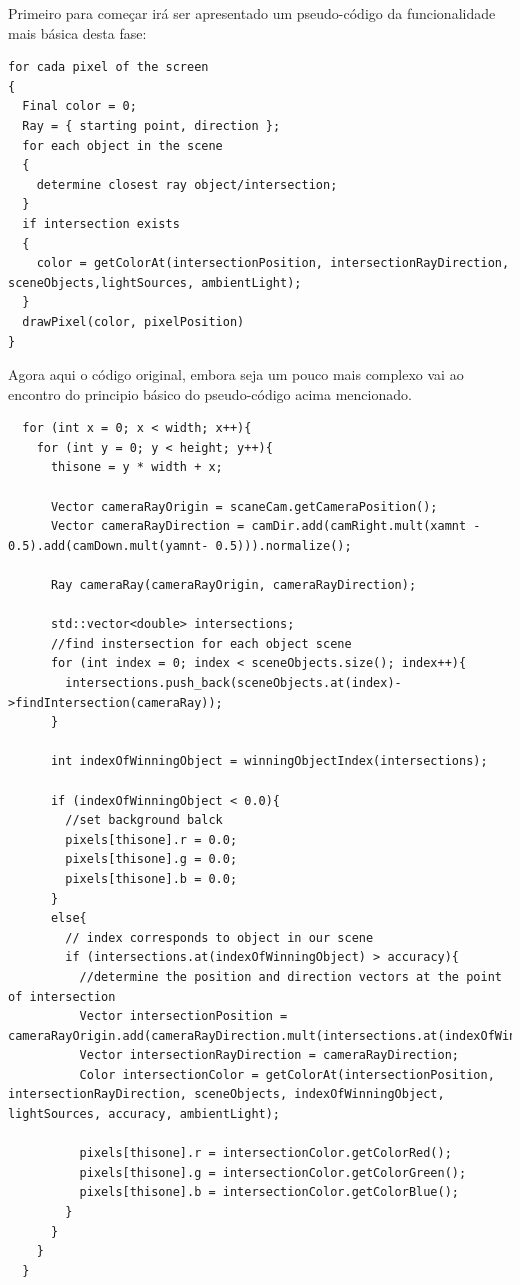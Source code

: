 \documentclass[12pt]{article}
\begin{document}
Primeiro para começar irá ser apresentado um pseudo-código da funcionalidade mais básica desta fase:\newline

\begin{lstlisting}
for cada pixel of the screen
{
  Final color = 0;
  Ray = { starting point, direction };
  for each object in the scene
  {
    determine closest ray object/intersection;
  }
  if intersection exists
  {
    color = getColorAt(intersectionPosition, intersectionRayDirection, sceneObjects,lightSources, ambientLight);
  }
  drawPixel(color, pixelPosition)
}
\end{lstlisting}

Agora aqui o código original, embora seja um pouco mais complexo vai ao encontro do principio básico do pseudo-código acima mencionado.\newline
\begin{lstlisting}
  for (int x = 0; x < width; x++){
    for (int y = 0; y < height; y++){
      thisone = y * width + x;

      Vector cameraRayOrigin = scaneCam.getCameraPosition();
      Vector cameraRayDirection = camDir.add(camRight.mult(xamnt - 0.5).add(camDown.mult(yamnt- 0.5))).normalize();

      Ray cameraRay(cameraRayOrigin, cameraRayDirection);

      std::vector<double> intersections;
      //find instersection for each object scene
      for (int index = 0; index < sceneObjects.size(); index++){
        intersections.push_back(sceneObjects.at(index)->findIntersection(cameraRay));
      }

      int indexOfWinningObject = winningObjectIndex(intersections);

      if (indexOfWinningObject < 0.0){
        //set background balck
        pixels[thisone].r = 0.0;
        pixels[thisone].g = 0.0;
        pixels[thisone].b = 0.0;
      }
      else{
        // index corresponds to object in our scene
        if (intersections.at(indexOfWinningObject) > accuracy){
          //determine the position and direction vectors at the point of intersection
          Vector intersectionPosition = cameraRayOrigin.add(cameraRayDirection.mult(intersections.at(indexOfWinningObject)));
          Vector intersectionRayDirection = cameraRayDirection;
          Color intersectionColor = getColorAt(intersectionPosition, intersectionRayDirection, sceneObjects, indexOfWinningObject, lightSources, accuracy, ambientLight);

          pixels[thisone].r = intersectionColor.getColorRed();
          pixels[thisone].g = intersectionColor.getColorGreen();
          pixels[thisone].b = intersectionColor.getColorBlue();
        }
      }
    }
  }
\end{lstlisting}
\end{document}
